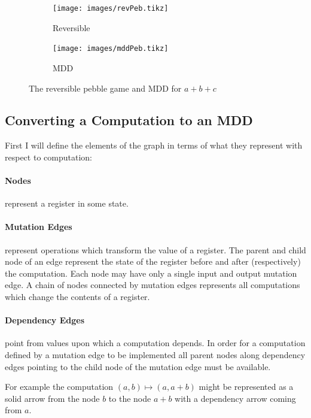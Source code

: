 \begin{figure}
  \centering
  \begin{subfigure}{0.3\textwidth}
    \texttt{[image: images/revPeb.tikz]}
    \caption{Reversible}
  \end{subfigure}
  \qquad\qquad
  \begin{subfigure}{0.3\textwidth}
    \texttt{[image: images/mddPeb.tikz]}
    \caption{MDD}
  \end{subfigure}
  \label{fig:mddExample}
  \caption{The reversible pebble game and MDD for $a+b+c$}
\end{figure}


\subsection{Converting a Computation to an MDD}

First I will define the elements of the graph in terms of what they represent
with respect to computation:

\paragraph{Nodes} represent a register in some state.

\paragraph{Mutation Edges} represent operations which transform the value
of a register. The parent and child node of an edge represent the state of the
register before and after (respectively) the computation. Each node may have
only a single input and output mutation edge. A chain of nodes connected by
mutation edges represents all computations which change the contents of a
register.

\paragraph{Dependency Edges} point from values upon which a computation
depends. In order for a computation defined by a mutation edge to be implemented
all parent nodes along dependency edges pointing to the child node of the
mutation edge must be available.

For example the computation $(a,b)\mapsto(a,a+b)$ might be represented as a
solid arrow from the node $b$ to the node $a+b$ with a dependency arrow coming
from $a$.


